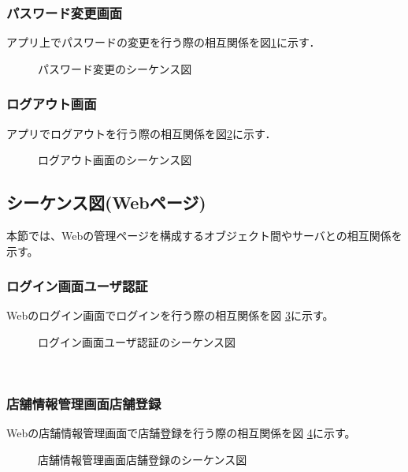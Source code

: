 \documentclass[a4j]{jarticle}
\begin{document}
  \subsubsection{パスワード変更画面}
  \label{tabs:ChangePasswordSequence}
  アプリ上でパスワードの変更を行う際の相互関係を図\ref{tab:ChangePasswordSequence}に示す．
  \begin{figure}[H]
  \begin{center}
  \caption{パスワード変更のシーケンス図}
  \label{tab:ChangePasswordSequence}
  \end{center}
  \end{figure}


  \subsubsection{ログアウト画面}
  \label{tabs:LogoutSequence}
  アプリでログアウトを行う際の相互関係を図\ref{tab:LogoutSequence}に示す．
  \begin{figure}[H]
  \begin{center}
  \caption{ログアウト画面のシーケンス図}
  \label{tab:LogoutSequence}
  \end{center}
  \end{figure}



  \subsection{シーケンス図(Webページ)}
  	本節では、Webの管理ページを構成するオブジェクト間やサーバとの相互関係を示す。

  	\subsubsection{ログイン画面ユーザ認証}
  	Webのログイン画面でログインを行う際の相互関係を図 \ref{tab:oonishi1}に示す。
  	\begin{figure}[H]
  	\begin{center}
  	\caption{ログイン画面ユーザ認証のシーケンス図}
  	\label{tab:oonishi1}
  	\end{center}
  	\end{figure}　　
  	\subsubsection{店舗情報管理画面店舗登録}
  	Webの店舗情報管理画面で店舗登録を行う際の相互関係を図 \ref{tab:oonishi2}に示す。
  	\begin{figure}[H]
  	\begin{center}
  	\caption{店舗情報管理画面店舗登録のシーケンス図}
  	\label {tab:oonishi2}
  	\end{center}
  	\end{figure}
\end{document}
